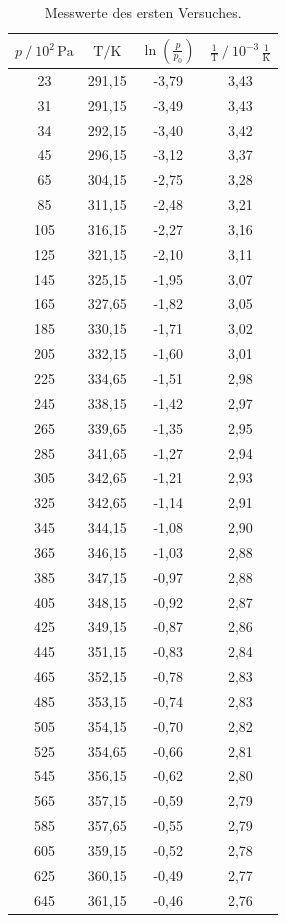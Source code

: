 \begin{table}[H]    
    \centering
    \caption{Messwerte des ersten Versuches.} 
    \label{Tabelle1}
    \begin{tabular} {c|  c|  c|  c}
        \toprule
        {$ p \mathbin{/} 10^{2}\, \unit{\pascal} $} &
        {$ \text{T} \mathbin{/} \unit{\kelvin} $} &
        {$ \ln \left(\frac{p}{p_{0}}\right) $} &
        {$ \frac{1}{\text{T}} \mathbin{/} 10^{-3}\,\frac{1}{\unit{\kelvin}} $} \\
        \midrule
        23  & 291,15 & -3,79 & 3,43 \\
        31  & 291,15 & -3,49 & 3,43 \\
        34  & 292,15 & -3,40 & 3,42 \\
        45  & 296,15 & -3,12 & 3,37 \\
        65  & 304,15 & -2,75 & 3,28 \\
        85  & 311,15 & -2,48 & 3,21 \\
        105 & 316,15 & -2,27 & 3,16 \\
        125 & 321,15 & -2,10 & 3,11 \\
        145 & 325,15 & -1,95 & 3,07 \\
        165 & 327,65 & -1,82 & 3,05 \\
        185 & 330,15 & -1,71 & 3,02 \\
        205 & 332,15 & -1,60 & 3,01 \\
        225 & 334,65 & -1,51 & 2,98 \\
        245 & 338,15 & -1,42 & 2,97 \\
        265 & 339,65 & -1,35 & 2,95 \\
        285 & 341,65 & -1,27 & 2,94 \\
        305 & 342,65 & -1,21 & 2,93 \\
        325 & 342,65 & -1,14 & 2,91 \\
        345 & 344,15 & -1,08 & 2,90 \\
        365 & 346,15 & -1,03 & 2,88 \\
        385 & 347,15 & -0,97 & 2,88 \\
        405 & 348,15 & -0,92 & 2,87 \\
        425 & 349,15 & -0,87 & 2,86 \\
        445 & 351,15 & -0,83 & 2,84 \\
        465 & 352,15 & -0,78 & 2,83 \\
        485 & 353,15 & -0,74 & 2,83 \\
        505 & 354,15 & -0,70 & 2,82 \\
        525 & 354,65 & -0,66 & 2,81 \\
        545 & 356,15 & -0,62 & 2,80 \\
        565 & 357,15 & -0,59 & 2,79 \\
        585 & 357,65 & -0,55 & 2,79 \\
        605 & 359,15 & -0,52 & 2,78 \\
        625 & 360,15 & -0,49 & 2,77 \\
        645 & 361,15 & -0,46 & 2,76 \\
        \bottomrule
    \end{tabular} 
\end{table}


